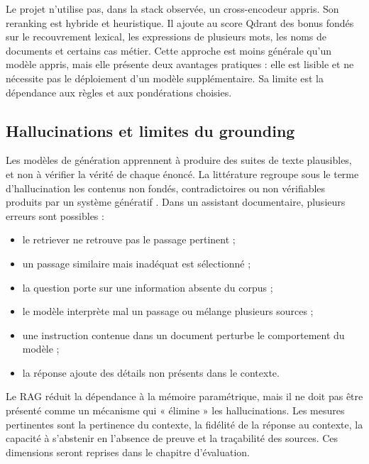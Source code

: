 Le projet n'utilise pas, dans la stack observée, un cross-encodeur appris. Son reranking est hybride et heuristique. Il ajoute au score Qdrant des bonus fondés sur le recouvrement lexical, les expressions de plusieurs mots, les noms de documents et certains cas métier. Cette approche est moins générale qu'un modèle appris, mais elle présente deux avantages pratiques : elle est lisible et ne nécessite pas le déploiement d'un modèle supplémentaire. Sa limite est la dépendance aux règles et aux pondérations choisies.

\subsection{Hallucinations et limites du grounding}

Les modèles de génération apprennent à produire des suites de texte plausibles, et non à vérifier la vérité de chaque énoncé. La littérature regroupe sous le terme d'hallucination les contenus non fondés, contradictoires ou non vérifiables produits par un système génératif \citep{Ji2023Hallucination}. Dans un assistant documentaire, plusieurs erreurs sont possibles :

\begin{itemize}
    \item le retriever ne retrouve pas le passage pertinent ;
    \item un passage similaire mais inadéquat est sélectionné ;
    \item la question porte sur une information absente du corpus ;
    \item le modèle interprète mal un passage ou mélange plusieurs sources ;
    \item une instruction contenue dans un document perturbe le comportement du modèle ;
    \item la réponse ajoute des détails non présents dans le contexte.
\end{itemize}

Le RAG réduit la dépendance à la mémoire paramétrique, mais il ne doit pas être présenté comme un mécanisme qui « élimine » les hallucinations. Les mesures pertinentes sont la pertinence du contexte, la fidélité de la réponse au contexte, la capacité à s'abstenir en l'absence de preuve et la traçabilité des sources. Ces dimensions seront reprises dans le chapitre d'évaluation.
